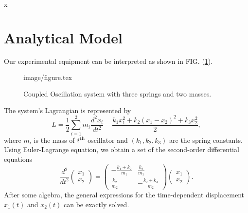 x\documentclass[12pt, a4paper, reprint, nofootinbib, twoside,  showkeys]{revtex4-1}
\begin{document}
\section{Analytical Model}
	Our experimental equipment can be interpreted as shown in FIG. (\ref{fig:system}).
	\begin{figure}[h]\centering
	{image/figure.tex}
	\caption{Coupled Oscillation system with three springs and two masses.}
	\label{fig:system}
	\end{figure}
	The system's Lagrangian is represented by 
	\begin{equation}
	L = \frac{1}{2}\sum_{i=1}^{2}m_i \frac{d^2x_i}{dt^2}
		-\frac{k_1x_1^2+k_2\left(x_1-x_2\right)^2+k_3x_2^2}{2},
	\end{equation}
	where $m_i$ is the mass of $i^{\rm th}$ oscillator and $\left(k_1,k_2,k_3\right)$ are the spring constants. Using Euler-Lagrange equation, we obtain a set of the second-order differential equations
	\begin{equation}
	\frac{d^2}{dt^2}\begin{pmatrix}x_1\\ x_2\end{pmatrix} =
	\begin{pmatrix}
	\displaystyle - \frac{k_1+k_2}{m_1}	&\displaystyle  \frac{k_2}{m_1}\\
	\displaystyle  \frac{k_2}{m_2} 		&\displaystyle  -\frac{k_2+k_3}{m_2}
	\end{pmatrix}
	\begin{pmatrix}x_1\\ x_2\end{pmatrix}.
	\end{equation}
	After some algebra, the general expressions for the time-dependent displacement $x_1\left(t\right)$ and $x_2\left(t\right)$ can be exactly solved.
\end{document}
